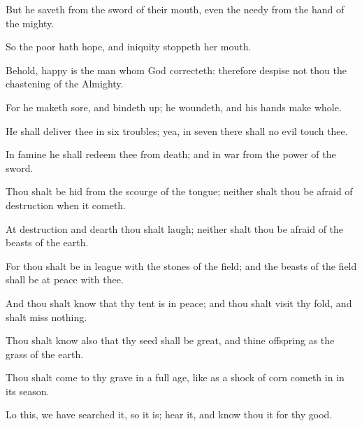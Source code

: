 \documentclass[12pt,oneside]{book}
\begin{document}
But he saveth from the sword of their mouth, even the needy from the hand of the mighty.

So the poor hath hope, and iniquity stoppeth her mouth.

Behold, happy is the man whom God correcteth: therefore despise not thou the chastening of the Almighty.

For he maketh sore, and bindeth up; he woundeth, and his hands make whole.

He shall deliver thee in six troubles; yea, in seven there shall no evil touch thee.

In famine he shall redeem thee from death; and in war from the power of the sword.

Thou shalt be hid from the scourge of the tongue; neither shalt thou be afraid of destruction when it cometh.

At destruction and dearth thou shalt laugh; neither shalt thou be afraid of the beasts of the earth.

For thou shalt be in league with the stones of the field; and the beasts of the field shall be at peace with thee.

And thou shalt know that thy tent is in peace; and thou shalt visit thy fold, and shalt miss nothing.

Thou shalt know also that thy seed shall be great, and thine offspring as the grass of the earth.

Thou shalt come to thy grave in a full age, like as a shock of corn cometh in in its season.

Lo this, we have searched it, so it is; hear it, and know thou it for thy good.
\end{document}

